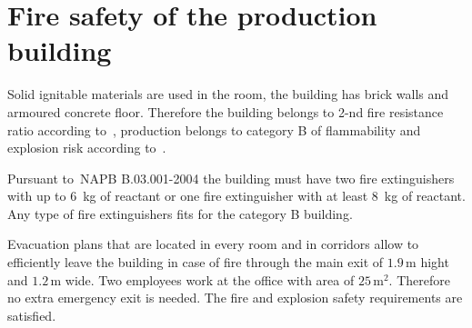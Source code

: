 \section{Fire safety of the production building}
Solid ignitable materials are used in the room, the building has brick walls
and armoured concrete floor. Therefore the building belongs to 2-nd fire
resistance ratio according to~\cite{dbn_b11}, production belongs to category B
of flammability and explosion risk according to~\cite{napb002}.

Pursuant to~NAPB B.03.001-2004 the building must have two fire extinguishers with
up to 6~kg of reactant or one fire extinguisher with at least 8~kg of reactant.
Any type of fire extinguishers fits for the category B building.

Evacuation plans that are located in every room and in corridors allow to
efficiently leave the building in case of fire through the main exit of 
 $1.9 \, \text{m}$ hight and $1.2 \, \text{m}$ wide. Two employees work at the
 office with area of $25 \, \text{m}^2$. Therefore no extra emergency exit is
 needed. The fire and explosion safety requirements are satisfied.


